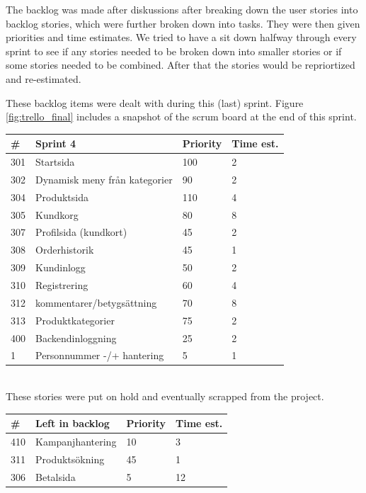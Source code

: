 \documentclass[paper=a4, fontsize=11pt]{report} %
\begin{document}
\begin{itemize}
	The backlog was made after diskussions after breaking down the user stories
	into backlog stories, which were further broken down into tasks. They were
	then given priorities and time estimates. We tried to have a sit down halfway
	through every sprint to see if any stories needed to be broken down into
	smaller stories or if some stories needed to be combined. After that the
	stories would be repriortized and re-estimated.

	These backlog items were dealt with during this (last) sprint.
	Figure \ref{fig:trello_final} includes a snapshot of the scrum board
	at the end of this sprint. \\

	\begin{tabular}{|l|l|l|l|}
		\hline
		\#  & Sprint 4                      & Priority & Time est. \\ \hline
		301 & Startsida                     & 100      & 2         \\ \hline
		302 & Dynamisk meny från kategorier & 90       & 2         \\ \hline
		304 & Produktsida                   & 110      & 4         \\ \hline
		305 & Kundkorg                      & 80       & 8         \\ \hline
		307 & Profilsida (kundkort)         & 45       & 2         \\ \hline
		308 & Orderhistorik                 & 45       & 1         \\ \hline
		309 & Kundinlogg                    & 50       & 2         \\ \hline
		310 & Registrering                  & 60       & 4         \\ \hline
		312 & kommentarer/betygsättning     & 70       & 8         \\ \hline
		313 & Produktkategorier             & 75       & 2         \\ \hline
		400 & Backendinloggning             & 25       & 2         \\ \hline
		1   & Personnummer -/+ hantering    & 5        & 1         \\ \hline
	\end{tabular} \\


	These stories were put on hold and eventually scrapped from the project.

	\begin{tabular}{|l|l|l|l|}
		\hline
		\#  & Left in backlog  & Priority & Time est. \\ \hline
		410 & Kampanjhantering & 10       & 3         \\ \hline
		311 & Produktsökning   & 45       & 1         \\ \hline
		306 & Betalsida        & 5        & 12        \\ \hline
	\end{tabular}


\end{itemize}
\end{document}
